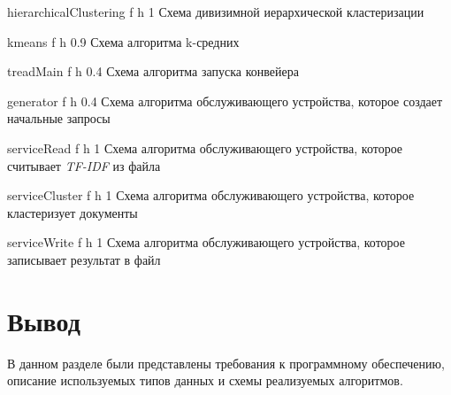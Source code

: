 {hierarchicalClustering} %
{f} %
{h} %
{1\textwidth} %
{Схема дивизимной иерархической кластеризации} %
\clearpage


{kmeans} %
{f} %
{h} %
{0.9\textwidth} %
{Схема алгоритма k-средних} %
\clearpage


{treadMain} %
{f} %
{h} %
{0.4\textwidth} %
{Схема алгоритма запуска конвейера} %
\clearpage

{generator} %
{f} %
{h} %
{0.4\textwidth} %
{Схема алгоритма обслуживающего устройства, которое создает начальные запросы} %
\clearpage

{serviceRead} %
{f} %
{h} %
{1\textwidth} %
{Схема алгоритма обслуживающего устройства, которое считывает \textit{TF-IDF} из файла} %
\clearpage

{serviceCluster} %
{f} %
{h} %
{1\textwidth} %
{Схема алгоритма обслуживающего устройства, которое кластеризует документы} %
\clearpage


{serviceWrite} %
{f} %
{h} %
{1\textwidth} %
{Схема алгоритма обслуживающего устройства, которое записывает результат в файл} %

\section *{Вывод}

В данном разделе были представлены требования к программному обеспечению, описание используемых типов данных и схемы реализуемых алгоритмов.
